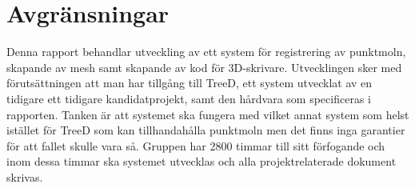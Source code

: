 \section{Avgränsningar}
\label{sec:delimitations}

Denna rapport behandlar utveckling av ett system för registrering av punktmoln, skapande av mesh samt skapande av kod för 3D-skrivare. Utvecklingen sker med förutsättningen att man har tillgång till TreeD, ett system utvecklat av en tidigare ett tidigare kandidatprojekt, samt den hårdvara som specificeras i rapporten. Tanken är att systemet ska fungera med vilket annat system som helst istället för TreeD som kan tillhandahålla punktmoln men det finns inga garantier för att fallet skulle vara så. Gruppen har 2800 timmar till sitt förfogande och inom dessa timmar ska systemet utvecklas och alla projektrelaterade dokument skrivas. 



